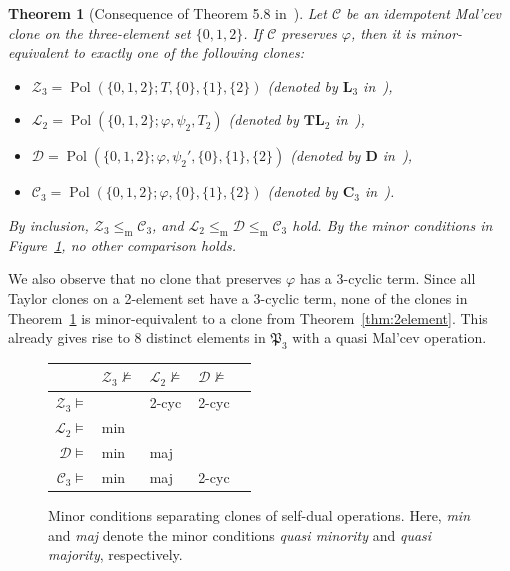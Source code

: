 \documentclass[12pt]{amsart}
\newtheorem{theorem}{Theorem}[section]
\theoremstyle{definition}
\theoremstyle{definition}
\newcommand{\Pthree}{\mathfrak P_{3}}
\newcommand{\clo}[1]{\mathcal{#1}}
\DeclareMathOperator{\Pol}{Pol}
\newcommand{\isaminorof}{\leq_{\mathrm{m}}}
\begin{document}
\begin{theorem}[Consequence of Theorem 5.8 in~\cite{BodirskyVucajZhuk}] \label{thm:selfdual}
Let $\mathcal C$ be an idempotent Mal'cev clone on the three-element set $\{0,1,2\}$. If $\mathcal C$ preserves $\varphi$, then it is minor-equivalent to exactly one of the following clones:
\begin{itemize}
\item $\mathcal Z_3 = \Pol(\{0,1,2\};T, \{0\},\{1\},\{2\} )$  \hfill (denoted by $\mathbf {L}_3$ in~\cite{BodirskyVucajZhuk}),
\item $\mathcal L_2 = \Pol(\{0,1,2\};\varphi,\psi_2,T_2)$  \hfill (denoted by $\mathbf {TL}_2$ in~\cite{BodirskyVucajZhuk}),
\item $\mathcal D = \Pol(\{0,1,2\};\varphi, \psi_2', \{0\},\{1\},\{2\})$  \hfill (denoted by $\mathbf D$ in~\cite{BodirskyVucajZhuk}),
\item $\mathcal C_3 = \Pol(\{0,1,2\};\varphi, \{0\},\{1\},\{2\})$ \hfill (denoted by $\mathbf C_3$ in~\cite{BodirskyVucajZhuk}).
\end{itemize}
By inclusion, $\mathcal Z_3 \isaminorof \mathcal C_3$, and $\mathcal L_2 \isaminorof \mathcal D \isaminorof \mathcal C_3$ hold. By the minor conditions in Figure~\ref{fig:selfdual}, no other comparison holds.
\end{theorem}

We also observe that no clone that preserves $\varphi$ has a 3-cyclic term. Since all Taylor clones on a 2-element set have a 3-cyclic term, none of the clones in Theorem~\ref{thm:selfdual} is minor-equivalent to a clone from Theorem~\ref{thm:2element}. This already gives rise to 8 distinct elements in $\Pthree$ with a quasi Mal'cev operation. 

\begin{figure}[h]
\centering
\begin{tabular}{r|llll}
& $\clo{Z}_3 \not \models$ & $\clo{L}_2 \not \models$ & $\clo{D} \not \models$ \\
\hline
$\clo{Z}_3 \models$ & & 2-cyc & 2-cyc \\
$\clo{L}_2 \models$ & min & & \\
$\clo{D} \models$ & min & maj & \\
$\clo{C}_3 \models$ & min & maj & 2-cyc
\end{tabular}
\caption{Minor conditions separating clones of self-dual operations. Here, \emph{min} and \emph{maj} denote the minor conditions \emph{quasi minority} and \emph{quasi majority}, respectively.}
\label{fig:selfdual}
\end{figure}
\end{document}
